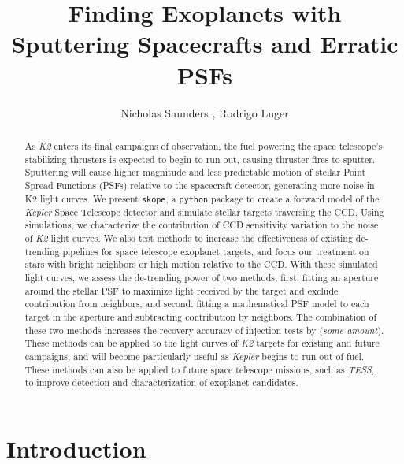 \documentclass[12pt,preprint]{aastex}
\begin{document}

\title{Finding Exoplanets with Sputtering Spacecrafts and Erratic PSFs}

\author{Nicholas Saunders , Rodrigo Luger }


\begin{abstract}

	As \textit{K2} enters its final campaigns of observation, the fuel powering the space telescope's stabilizing thrusters is expected to begin to run out, causing thruster fires to sputter. Sputtering will cause higher magnitude and less predictable motion of stellar Point Spread Functions (PSFs) relative to the spacecraft detector, generating more noise in K2 light curves. We present \texttt{skope}, a \texttt{python} package to create a forward model of the \textit{Kepler} Space Telescope detector and simulate stellar targets traversing the CCD. Using simulations, we characterize the contribution of CCD sensitivity variation to the noise of \textit{K2} light curves. We also test methods to increase the effectiveness of existing de-trending pipelines for space telescope exoplanet targets, and focus our treatment on stars with bright neighbors or high motion relative to the CCD. With these simulated light curves, we assess the de-trending power of two methods, first: fitting an aperture around the stellar PSF to maximize light received by the target and exclude contribution from neighbors, and second: fitting a mathematical PSF model to each target in the aperture and subtracting contribution by neighbors. The combination of these two methods increases the recovery accuracy of injection tests by (\textit{some amount}). These methods can be applied to the light curves of \textit{K2} targets for existing and future campaigns, and will become particularly useful as \textit{Kepler} begins to run out of fuel. These methods can also be applied to future space telescope missions, such as \textit{TESS}, to improve detection and characterization of exoplanet candidates.

\end{abstract}

\section{Introduction}
\end{document}
